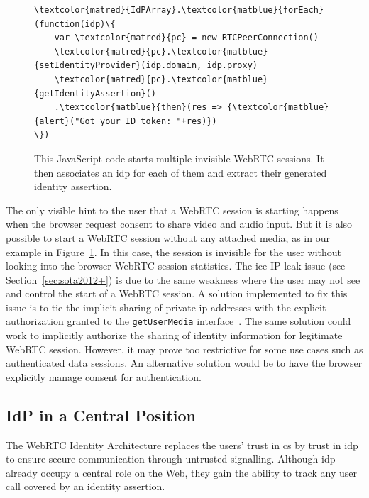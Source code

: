 \begin{figure}[H]
\begin{Verbatim}[commandchars=\\\{\}]
\textcolor{matred}{IdPArray}.\textcolor{matblue}{forEach}(function(idp)\{
    var \textcolor{matred}{pc} = new RTCPeerConnection()
    \textcolor{matred}{pc}.\textcolor{matblue}{setIdentityProvider}(idp.domain, idp.proxy)
    \textcolor{matred}{pc}.\textcolor{matblue}{getIdentityAssertion}()
    .\textcolor{matblue}{then}(res => {\textcolor{matblue}{alert}("Got your ID token: "+res)})
\})
\end{Verbatim}
\caption[JS Code for WebRTC Identity Collection]{This JavaScript code starts multiple invisible WebRTC sessions. It then associates an \gls{idp} for each of them and extract their generated identity assertion. }
\label{fig:audAttack}
\end{figure}

The only visible hint to the user that a WebRTC session is starting happens when the browser request consent to share video and audio input.
But it is also possible to start a WebRTC session without any attached media, as in our example in Figure~\ref{fig:audAttack}. 
In this case, the session is invisible for the user without looking into the browser WebRTC session statistics.
The \gls{ice} IP leak issue (see Section~\ref{sec:sota2012+}) is due to the same weakness where the user may not see and control the start of a WebRTC session.
A solution implemented to fix this issue is to tie the implicit sharing of private \gls{ip} addresses with the explicit authorization granted to the \texttt{getUserMedia} interface~\cite{I-D.ietf-rtcweb-ip-handling}.
The same solution could work to implicitly authorize the sharing of identity information for legitimate WebRTC session.
However, it may prove too restrictive for some use cases such as authenticated data sessions.
An alternative solution would be to have the browser explicitly manage consent for authentication.

\subsection{IdP in a Central Position}
\label{sec:idptrack}
The WebRTC Identity Architecture replaces the users' trust in \gls{cs} by trust in \gls{idp} to ensure secure communication through untrusted signalling.
Although \gls{idp} already occupy a central role on the Web, they gain the ability to track any user call covered by an identity assertion.

